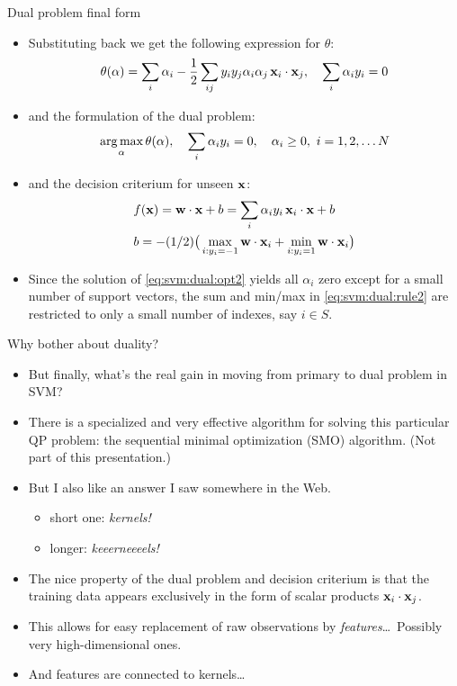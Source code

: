 \documentclass[handout]{beamer}   %
\def\argmax{\mathop{\rm arg\,max}\limits}
\def\b#1{{\bf #1}}
\begin{document}
\begin{frame}{Dual problem final form}
  \begin{itemize}[<+->]
  \item Substituting back we get the following expression for $\theta$:
    \begin{equation}
      \label{eq:svm:dual:theta2}
      \theta(\alpha) = 
      \sum_i\alpha_i
      - {1\over 2}\sum_{ij}y_iy_j\alpha_i\alpha_j\,\b x_i\cdot\b x_j,
      \quad \sum_i\alpha_iy_i=0
    \end{equation}
  \item and the formulation of the dual problem:
    \begin{equation}
      \label{eq:svm:dual:opt2}
      \argmax_\alpha \theta(\alpha), \quad
      \sum_i\alpha_iy_i=0, \quad \alpha_i \ge 0, \ i=1,2,\ldots N
    \end{equation}
  \item and the decision criterium for unseen $\b x$:  %
    \begin{align}
      \label{eq:svm:dual:rule2}
      & f(\b x) = \b w \cdot \b x + b = \sum_i\alpha_iy_i\,\b x_i\cdot \b x + b\\
      \nonumber
      & b = - (1/2)\big(\max_{i:y_i=-1}\b w\cdot\b x_i + \min_{i:y_i=1}\b w\cdot\b x_i\big)
    \end{align}
  \item Since the solution of \eqref{eq:svm:dual:opt2} yields all $\alpha_i$ zero except
    for a small number of support vectors, the sum and min/max in \eqref{eq:svm:dual:rule2}
    are restricted to only a small number of indexes, say $i\in S$.
  \end{itemize}
\end{frame}


\begin{frame}{Why bother about duality?}
  \begin{itemize}[<+->]
  \item But finally, what's the real gain in moving from primary to dual problem in SVM?
  \item There is a specialized and very effective algorithm for solving this particular
    QP problem: the sequential minimal optimization (SMO) algorithm. (Not part of this
    presentation.)
  \item But I also like an answer I saw somewhere in the Web.
    \begin{itemize}[<+->]
    \item short one: {\it kernels!}
    \item longer: {\it keeerneeeels!}
    \end{itemize}
  \item The nice property of the dual problem and decision criterium is that the
    training data appears exclusively in the form of scalar products $\b x_i\cdot \b x_j$.
  \item This allows for easy replacement of raw observations by {\it features}\dots\
    Possibly very high-dimensional ones.
  \item And features are connected to kernels\dots
  \end{itemize}
\end{frame}
\end{document}
